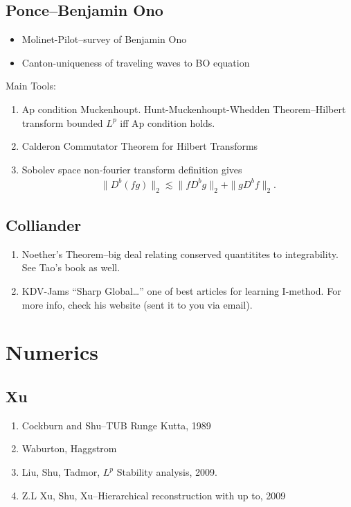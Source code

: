 \documentclass[12pt,reqno]{amsart}
\numberwithin{equation}{section}  %
\begin{document}
\subsection{Ponce--Benjamin Ono} 
\label{ssec:ponce-benono}
\begin{itemize}
    \item{}
    Molinet-Pilot--survey of Benjamin Ono
    \item{}
    Canton-uniqueness of traveling waves to BO equation
  \end{itemize}
  Main Tools:
\begin{enumerate}
\item{}
  Ap condition Muckenhoupt. Hunt-Muckenhoupt-Whedden Theorem--Hilbert transform bounded $L^{p}$ iff Ap condition holds.
  \item{}
  Calderon Commutator Theorem for Hilbert Transforms
  \item{}
  Sobolev space non-fourier transform definition gives
  \begin{equation*}
  \begin{split}
    \| D^{b}(fg) \|_{2} \lesssim \| fD^{b}g \|_{2} + \| gD^{b}f \|_{2}.
  \end{split}
  \end{equation*}
\end{enumerate}
  \subsection{Colliander} 
  \label{ssec:col-web}
  \begin{enumerate}
    \item{} Noether's Theorem--big deal relating conserved quantitites to integrability. See Tao's book as well.
    \item{} KDV-Jams ``Sharp Global\ldots'' one of best articles for learning I-method. For more info, check his website (sent it to you via email).
    \end{enumerate}
    \section{Numerics} 
    \label{sec:numerics}
    \subsection{Xu} 
    \begin{enumerate}
    \item{}
    Cockburn and Shu--TUB Runge Kutta, 1989
    \item{}
    Waburton, Haggstrom
    \item{}
      Liu, Shu, Tadmor, $L^{p}$ Stability analysis, 2009.
      \item{}
      Z.L Xu, Shu, Xu--Hierarchical reconstruction with up to, 2009
    \end{enumerate}
        
\end{document}
